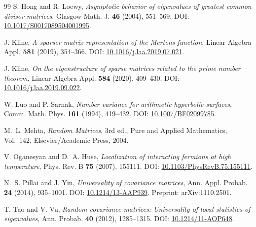 \documentclass[11pt]{amsart}
\numberwithin{equation}{section}
\theoremstyle{plain}
\theoremstyle{definition}
\theoremstyle{remark}
\begin{document}
\begin{thebibliography}{99}
S. Hong and R. Loewy,
\emph{Asymptotic behavior of eigenvalues of greatest common divisor matrices},
Glasgow Math. J. \textbf{46} (2004), 551--569.
DOI: \href{https://doi.org/10.1017/S0017089504001995}{10.1017/S0017089504001995}.

J. Kline,
\emph{A sparser matrix representation of the Mertens function},
Linear Algebra Appl. \textbf{581} (2019), 354--366.
DOI: \href{https://doi.org/10.1016/j.laa.2019.07.021}{10.1016/j.laa.2019.07.021}.

J. Kline,
\emph{On the eigenstructure of sparse matrices related to the prime number theorem},
Linear Algebra Appl. \textbf{584} (2020), 409--430.
DOI: \href{https://doi.org/10.1016/j.laa.2019.09.022}{10.1016/j.laa.2019.09.022}.

W. Luo and P. Sarnak,
\emph{Number variance for arithmetic hyperbolic surfaces},
Comm. Math. Phys. \textbf{161} (1994), 419--432.
DOI: \href{https://doi.org/10.1007/BF02099785}{10.1007/BF02099785}.

M.~L. Mehta,
\emph{Random Matrices}, 3rd ed.,
Pure and Applied Mathematics, Vol.~142,
Elsevier/Academic Press, 2004.

V. Oganesyan and D.~A. Huse,
\emph{Localization of interacting fermions at high temperature},
Phys. Rev. B \textbf{75} (2007), 155111.
DOI: \href{https://doi.org/10.1103/PhysRevB.75.155111}{10.1103/PhysRevB.75.155111}.

N.~S. Pillai and J. Yin,
\emph{Universality of covariance matrices},
Ann. Appl. Probab. \textbf{24} (2014), 935--1001.
DOI: \href{https://doi.org/10.1214/13-AAP939}{10.1214/13-AAP939}.
Preprint: arXiv:1110.2501.

T. Tao and V. Vu,
\emph{Random covariance matrices: Universality of local statistics of eigenvalues},
Ann. Probab. \textbf{40} (2012), 1285--1315.
DOI: \href{https://doi.org/10.1214/11-AOP648}{10.1214/11-AOP648}.

\end{thebibliography}
\end{document}
